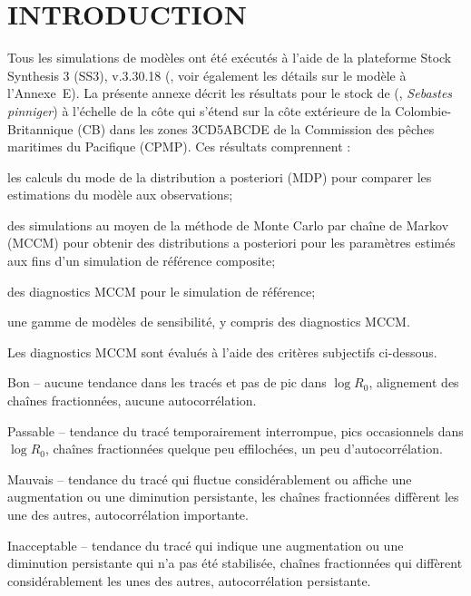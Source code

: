 \documentclass[11pt]{book}
\newcommand{\AppEqn}{Annexe~E}
\begin{document}
\section{INTRODUCTION}

Tous les simulations de mod\`{e}les ont \'{e}t\'{e} ex\'{e}cut\'{e}s \`{a} l'aide de la plateforme Stock Synthesis 3 (SS3), v.3.30.18 (\citealt{Methot-etal:2021}, voir \'{e}galement les d\'{e}tails sur le mod\`{e}le \`{a} l'\AppEqn{}).
La pr\'{e}sente annexe d\'{e}crit les r\'{e}sultats pour le stock de \SPP{} (\SPC, \emph{Sebastes pinniger}) \`{a} l'\'{e}chelle de la c\^{o}te qui s'\'{e}tend sur la c\^{o}te ext\'{e}rieure de la Colombie-Britannique (CB) dans les zones 3CD5ABCDE de la Commission des p\^{e}ches maritimes du Pacifique (CPMP). 
Ces r\'{e}sultats comprennent :
\vspace{-0.5\baselineskip}
\begin{itemize_csas}{}{}
\item les calculs du mode de la distribution a posteriori (MDP) pour comparer les estimations du mod\`{e}le aux observations;
\item des simulations au moyen de la m\'{e}thode de Monte Carlo par cha\^{i}ne de Markov (MCCM) pour obtenir des distributions a posteriori pour les param\`{e}tres estim\'{e}s aux fins d'un simulation de r\'{e}f\'{e}rence composite;
\item des diagnostics MCCM pour le simulation de r\'{e}f\'{e}rence;
\item une gamme de mod\`{e}les de sensibilit\'{e}, y compris des diagnostics MCCM.
\end{itemize_csas}
Les diagnostics MCCM sont \'{e}valu\'{e}s \`{a} l'aide des crit\`{e}res subjectifs ci-dessous.
\begin{itemize_csas}{}{}
  \item Bon -- aucune tendance dans les trac\'{e}s et pas de pic dans $\log R_0$, alignement des cha\^{i}nes fractionn\'{e}es, aucune autocorr\'{e}lation.
  \item Passable -- tendance du trac\'{e} temporairement interrompue, pics occasionnels dans $\log R_0$, cha\^{i}nes fractionn\'{e}es quelque peu effiloch\'{e}es, un peu d'autocorr\'{e}lation.
  \item Mauvais -- tendance du trac\'{e} qui fluctue consid\'{e}rablement ou affiche une augmentation ou une diminution persistante, les cha\^{i}nes fractionn\'{e}es diff\`{e}rent les une des autres, autocorr\'{e}lation importante.
  \item Inacceptable -- tendance du trac\'{e} qui indique une augmentation ou une diminution persistante qui n'a pas \'{e}t\'{e} stabilis\'{e}e, cha\^{i}nes fractionn\'{e}es qui diff\`{e}rent consid\'{e}rablement les unes des autres, autocorr\'{e}lation persistante.
\end{itemize_csas}
\end{document}
